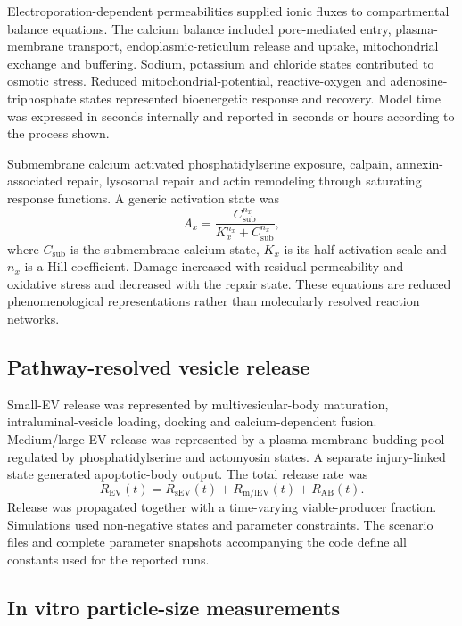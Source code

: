 Electroporation-dependent permeabilities supplied ionic fluxes to compartmental balance equations. The calcium balance included pore-mediated entry, plasma-membrane transport, endoplasmic-reticulum release and uptake, mitochondrial exchange and buffering. Sodium, potassium and chloride states contributed to osmotic stress. Reduced mitochondrial-potential, reactive-oxygen and adenosine-triphosphate states represented bioenergetic response and recovery. Model time was expressed in seconds internally and reported in seconds or hours according to the process shown.

Submembrane calcium activated phosphatidylserine exposure, calpain, annexin-associated repair, lysosomal repair and actin remodeling through saturating response functions. A generic activation state was
\begin{equation}
A_x=\frac{C_{\mathrm{sub}}^{n_x}}{K_x^{n_x}+C_{\mathrm{sub}}^{n_x}},
\end{equation}
where $C_{\mathrm{sub}}$ is the submembrane calcium state, $K_x$ is its half-activation scale and $n_x$ is a Hill coefficient. Damage increased with residual permeability and oxidative stress and decreased with the repair state. These equations are reduced phenomenological representations rather than molecularly resolved reaction networks.

\subsection*{Pathway-resolved vesicle release}

Small-EV release was represented by multivesicular-body maturation, intraluminal-vesicle loading, docking and calcium-dependent fusion. Medium/large-EV release was represented by a plasma-membrane budding pool regulated by phosphatidylserine and actomyosin states. A separate injury-linked state generated apoptotic-body output. The total release rate was
\begin{equation}
R_{\mathrm{EV}}(t)=R_{\mathrm{sEV}}(t)+R_{\mathrm{m/lEV}}(t)+R_{\mathrm{AB}}(t).
\end{equation}
Release was propagated together with a time-varying viable-producer fraction. Simulations used non-negative states and parameter constraints. The scenario files and complete parameter snapshots accompanying the code define all constants used for the reported runs.

\subsection*{In vitro particle-size measurements}

